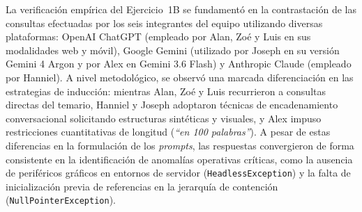 \documentclass[letterpaper,12pt,oneside]{article}
\numberwithin{figure}{section}
\begin{document}
La verificación empírica del Ejercicio~1B se fundamentó en la contrastación de las consultas efectuadas por los seis integrantes del equipo utilizando diversas plataformas: OpenAI ChatGPT (empleado por Alan, Zoé y Luis en sus modalidades web y móvil), Google Gemini (utilizado por Joseph en su versión Gemini 4 Argon y por Alex en Gemini 3.6 Flash) y Anthropic Claude (empleado por Hanniel). A nivel metodológico, se observó una marcada diferenciación en las estrategias de inducción: mientras Alan, Zoé y Luis recurrieron a consultas directas del temario, Hanniel y Joseph adoptaron técnicas de encadenamiento conversacional solicitando estructuras sintéticas y visuales, y Alex impuso restricciones cuantitativas de longitud (\textit{``en 100 palabras''}). A pesar de estas diferencias en la formulación de los \textit{prompts}, las respuestas convergieron de forma consistente en la identificación de anomalías operativas críticas, como la ausencia de periféricos gráficos en entornos de servidor (\texttt{HeadlessException}) y la falta de inicialización previa de referencias en la jerarquía de contención (\texttt{NullPointerException}).
\end{document}

